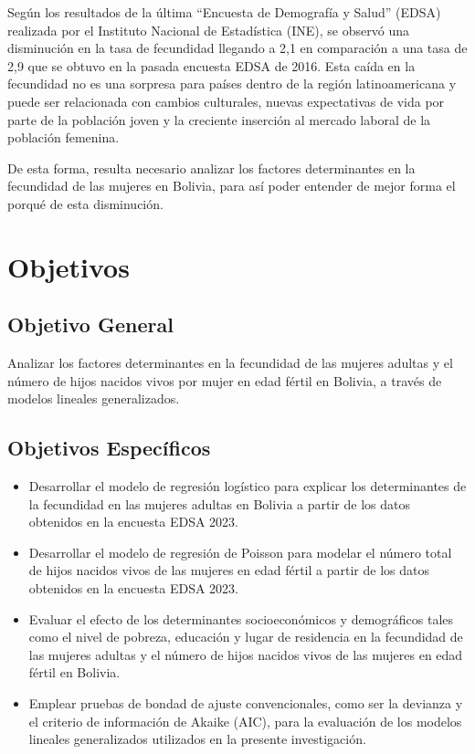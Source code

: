\documentclass[Royal,times,sageh]{sagej}
\begin{document}
Según los resultados de la última ``Encuesta de Demografía y Salud''
(EDSA) realizada por el Instituto Nacional de Estadística (INE), se
observó una disminución en la tasa de fecundidad llegando a 2,1 en
comparación a una tasa de 2,9 que se obtuvo en la pasada encuesta EDSA
de 2016. Esta caída en la fecundidad no es una sorpresa para países
dentro de la región latinoamericana y puede ser relacionada con cambios
culturales, nuevas expectativas de vida por parte de la población joven
y la creciente inserción al mercado laboral de la población femenina.

De esta forma, resulta necesario analizar los factores determinantes en
la fecundidad de las mujeres en Bolivia, para así poder entender de
mejor forma el porqué de esta disminución.

\section{Objetivos}\label{objetivos}

\subsection{Objetivo General}\label{objetivo-general}

Analizar los factores determinantes en la fecundidad de las mujeres
adultas y el número de hijos nacidos vivos por mujer en edad fértil en
Bolivia, a través de modelos lineales generalizados.

\subsection{Objetivos Específicos}\label{objetivos-especuxedficos}

\begin{itemize}
\item
  Desarrollar el modelo de regresión logístico para explicar los
  determinantes de la fecundidad en las mujeres adultas en Bolivia a
  partir de los datos obtenidos en la encuesta EDSA 2023.
\item
  Desarrollar el modelo de regresión de Poisson para modelar el número
  total de hijos nacidos vivos de las mujeres en edad fértil a partir de
  los datos obtenidos en la encuesta EDSA 2023.
\item
  Evaluar el efecto de los determinantes socioeconómicos y demográficos
  tales como el nivel de pobreza, educación y lugar de residencia en la
  fecundidad de las mujeres adultas y el número de hijos nacidos vivos
  de las mujeres en edad fértil en Bolivia.
\item
  Emplear pruebas de bondad de ajuste convencionales, como ser la
  devianza y el criterio de información de Akaike (AIC), para la
  evaluación de los modelos lineales generalizados utilizados en la
  presente investigación.
\end{itemize}
\end{document}
